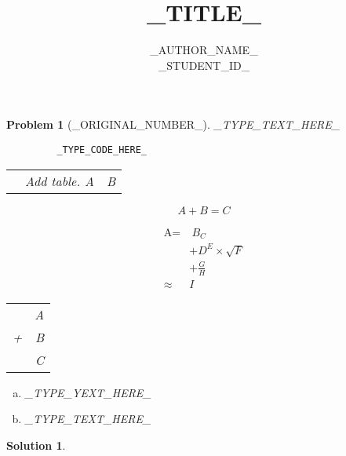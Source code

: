 \documentclass[12pt]{article}
\newtheorem{problem}{Problem}[]
\newtheorem*{solution}{Solution}
\begin{document}
  \title{\textbf{_TITLE_}}
    \author{_AUTHOR_NAME_\\
      _STUDENT_ID_}
    \maketitle

    \begin{problem}[_ORIGINAL_NUMBER_]
    
      _TYPE_TEXT_HERE_            %
      
      \begin{lstlisting}
         _TYPE_CODE_HERE_
      \end{lstlisting}
      
      \begin{tabular}{|l|c|r|}    & Add table.
        \hline  
        A&B%
        \hline 
      \end{tabular}
      
      \[A+B=C\]                   %
        
      \[                          %
        \begin{split}
        \text{A}=&~B_{C}\\
        &+D^{E}\times \sqrt{F} \\
        &+\frac{G}{H} \\
        \approx &I
        \end{split}
      \]
      
      \begin{tabular}{cD{.}{.}{3}}%
         &A\\
        +&B\\
        \hline
         &C\\
      \end{tabular}
      
      \begin{enumerate}[a.]
        \item _TYPE_YEXT_HERE_
        \item _TYPE_TEXT_HERE_
        
      \end{enumerate}
    \end{problem}
    
    \begin{solution}
    \end{solution}
\end{document}
